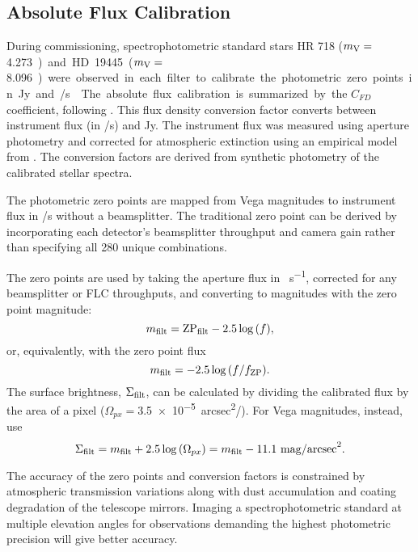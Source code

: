 \subsection{Absolute Flux Calibration}

During commissioning, spectrophotometric standard stars HR 718 ($m_{\rm V}=$ \SI{4.273}) and HD 19445 ($m_{\rm V}=$ \SI{8.096}) were observed in each filter to calibrate the photometric zero points in \si{Jy} and \si{\electron/\second} \citep{hamuy_southern_1992,hamuy_southern_1994,stone_spectrophotometry_1996,zacharias_fourth_2013}.

The absolute flux calibration is summarized by the $C_{FD}$ coefficient, following \citet{gordon_james_2022}. This flux density conversion factor converts between instrument flux (in \si{\electron/\second}) and \si{Jy}. The instrument flux was measured using aperture photometry and corrected for atmospheric extinction using an empirical model from  \citet{buton_atmospheric_2013}. The conversion factors are derived from synthetic photometry of the calibrated stellar spectra.

The photometric zero points are mapped from Vega magnitudes to instrument flux in \si{\electron/\second} without a beamsplitter. The traditional zero point can be derived by incorporating each detector's beamsplitter throughput and camera gain rather than specifying all \num{280} unique combinations.

The zero points are used by taking the aperture flux in \si{\electron\per\second}, corrected for any beamsplitter or FLC throughputs, and converting to magnitudes with the zero point magnitude:
\begin{equation}
    m_{\rm filt}=\mathrm{ZP}_\mathrm{filt} - 2.5\log{\left(f\right)},
\end{equation}
or, equivalently, with the zero point flux
\begin{equation}
    m_{\rm filt}=-2.5\log{\left(f/f_\mathrm{ZP}\right)}.
\end{equation}
The surface brightness, $\Sigma_{\rm filt}$, can be calculated by dividing the calibrated flux by the area of a pixel ($\Omega_{px}=$\SI{3.5e-5}{arcsec^2/\pixel}). For Vega magnitudes, instead, use
\begin{equation}
    \label{eqn:surf_bright}
    \Sigma_{\rm filt} = m_{\rm filt} + 2.5\log{\left(\Omega_{px}\right)} = m_{\rm filt}- 11.1~\mathrm{mag/arcsec}^2.
\end{equation}

The accuracy of the zero points and conversion factors is constrained by atmospheric transmission variations along with dust accumulation and coating degradation of the telescope mirrors. Imaging a spectrophotometric standard at multiple elevation angles for observations demanding the highest photometric precision will give better accuracy.


